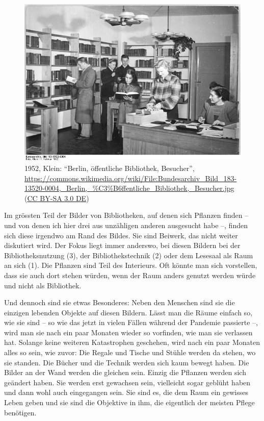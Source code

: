 \documentclass[a4paper,
fontsize=11pt,
oneside,
numbers=noperiodatend,
parskip=half-,
bibliography=totoc,
final
]{scrartcl}
\begin{document}
\begin{figure}
\centering
\includegraphics[width=0.7\columnwidth]{img/bundesarchiv-183-13520-0004.jpg}
\caption{1952, Klein: \enquote{Berlin, öffentliche Bibliothek,
Besucher},
\url{https://commons.wikimedia.org/wiki/File:Bundesarchiv_Bild_183-13520-0004,_Berlin,_\%C3\%B6ffentliche_Bibliothek,_Besucher.jpg}
(\href{https://creativecommons.org/licenses/by-sa/3.0/de/legalcode}{CC
BY-SA 3.0 DE})}
\end{figure}

Im grössten Teil der Bilder von Bibliotheken, auf denen sich Pflanzen
finden -- und von denen ich hier drei aus unzähligen anderen ausgesucht
habe --, finden sich diese irgendwo am Rand des Bildes. Sie sind
Beiwerk, das nicht weiter diskutiert wird. Der Fokus liegt immer
anderswo, bei diesen Bildern bei der Bibliotheksnutzung (3), der
Bibliothekstechnik (2) oder dem Lesesaal als Raum an sich (1). Die
Pflanzen sind Teil des Interieurs. Oft könnte man sich vorstellen, dass
sie auch dort stehen würden, wenn der Raum anders genutzt werden würde
und nicht als Bibliothek.

Und dennoch sind sie etwas Besonderes: Neben den Menschen sind sie die
einzigen lebenden Objekte auf diesen Bildern. Lässt man die Räume
einfach so, wie sie sind -- so wie das jetzt in vielen Fällen während
der Pandemie passierte --, wird man sie nach ein paar Monaten wieder so
vorfinden, wie man sie verlassen hat. Solange keine weiteren
Katastrophen geschehen, wird nach ein paar Monaten alles so sein, wie
zuvor: Die Regale und Tische und Stühle werden da stehen, wo sie
standen. Die Bücher und die Technik werden sich kaum bewegt haben. Die
Bilder an der Wand werden die gleichen sein. Einzig die Pflanzen werden
sich geändert haben. Sie werden erst gewachsen sein, vielleicht sogar
geblüht haben und dann wohl auch eingegangen sein. Sie sind es, die dem
Raum ein gewisses Leben geben und sie sind die Objektive in ihm, die
eigentlich der meisten Pflege benötigen.
\end{document}
